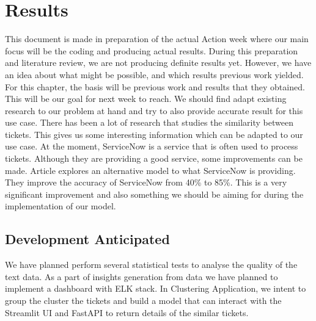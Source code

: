 \documentclass[a4paper,12pt]{report}
\begin{document}
    \chapter{Results}
    This document is made in preparation of the actual Action week where our main focus will be the coding and producing actual results. During this preparation and literature review, we are not producing definite results yet. However, we have an idea about what might be possible, and which results previous work yielded. For this chapter, the basis will be previous work and results that they obtained. This will be our goal for next week to reach. We should find adapt existing research to our problem at hand and try to also provide accurate result for this use case.
    \newline\newline
    There has been a lot of research that studies the similarity between tickets. This gives us some interesting information which can be adapted to our use case. At the moment, ServiceNow is a service that is often used to process tickets. Although they are providing a good service, some improvements can be made. Article\cite{Garrett2020} explores an alternative model to what ServiceNow is providing. They improve the accuracy of ServiceNow from 40\% to 85\%. This is a very significant improvement and also something we should be aiming for during the implementation of our model.

    \section{Development Anticipated}
    We have planned perform several statistical tests to analyse the quality of the text data.
    As a part of insights generation from data we have planned to implement a dashboard with ELK stack. In Clustering Application, we intent to group the cluster the tickets and build a model that can interact with the Streamlit UI and FastAPI to return details of the similar tickets.
\end{document}
